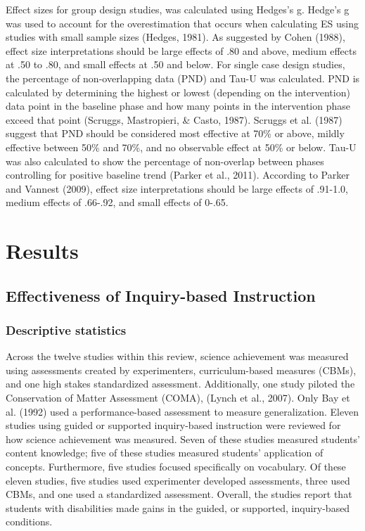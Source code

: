 \documentclass[11.5pt]{sig-alternate} %
\begin{document}
\begin{large}
Effect sizes for group design studies, was calculated using Hedges’s g.  Hedge’s g was used to account for the overestimation that occurs when calculating ES using studies with small sample sizes (Hedges, 1981).  As suggested by Cohen (1988), effect size interpretations should be large effects of .80 and above, medium effects at .50 to .80, and small effects at .50 and below.  For single case design studies, the percentage of non-overlapping data (PND) and Tau-U was calculated.  PND is calculated by determining the highest or lowest (depending on the intervention) data point in the baseline phase and how many points in the intervention phase exceed that point (Scruggs, Mastropieri, \& Casto, 1987).  Scruggs et al. (1987) suggest that PND should be considered most effective at 70\% or above, mildly effective between 50\% and 70\%, and no observable effect at 50\% or below. Tau-U was also calculated to show the percentage of non-overlap between phases controlling for positive baseline trend (Parker et al., 2011).  According to Parker and Vannest (2009), effect size interpretations should be large effects of .91-1.0, medium effects of .66-.92, and small effects of 0-.65.  

\section*{Results}

\subsection*{Effectiveness of Inquiry-based Instruction}

\subsubsection*{Descriptive statistics}
Across the twelve studies within this review, science achievement was measured using assessments created by experimenters, curriculum-based measures (CBMs), and one high stakes standardized assessment.  Additionally, one study piloted the Conservation of Matter Assessment (COMA), (Lynch et al., 2007).  Only Bay et al. (1992) used a performance-based assessment to measure generalization.  Eleven studies using guided or supported inquiry-based instruction were reviewed for how science achievement was measured.  Seven of these studies measured students’ content knowledge; five of these studies measured students’ application of concepts.  Furthermore, five studies focused specifically on vocabulary.  Of these eleven studies, five studies used experimenter developed assessments, three used CBMs, and one used a standardized assessment.  Overall, the studies report that students with disabilities made gains in the guided, or supported, inquiry-based conditions.


\end{large}
\end{document}
